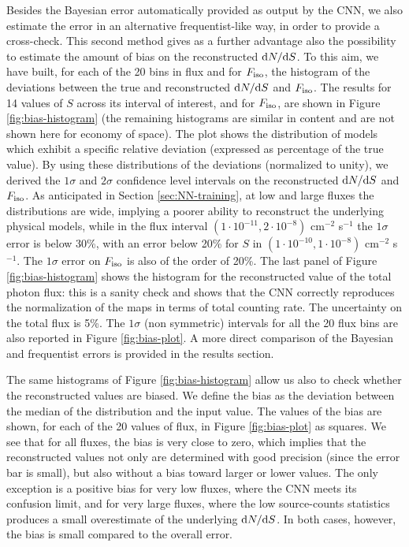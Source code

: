 Besides the Bayesian error automatically provided as output by the CNN, we also estimate the error in an alternative frequentist-like way, in order to provide a cross-check. This second method gives as a further advantage also the possibility to estimate the amount of bias on the reconstructed $\text{d}N/\text{d}S$.
To this aim, we have built, for each of the 20 bins in flux and for $F_{\text{iso}}$, the histogram of the deviations between the true and reconstructed $\text{d}N/\text{d}S$  and $F_{\text{iso}}$. The results for 14 values of $S$ across its interval of interest, and for $F_{\text{iso}}$, are shown in Figure \ref{fig:bias-histogram} (the remaining histograms are similar in content and are not shown here for economy of space). The plot shows the distribution of models which exhibit a specific relative deviation (expressed as percentage of the true value). By using these
distributions of the deviations (normalized to unity), we derived the $1\sigma$ and $2\sigma$ confidence level intervals on the reconstructed $\text{d}N/\text{d}S$ and $F_{\text{iso}}$. As anticipated in Section \ref{sec:NN-training}, at low and large fluxes the distributions are wide, implying a poorer ability to reconstruct the underlying physical models, while in the flux interval $(1 \cdot 10^{-11}, 2 \cdot 10^{-8})$ cm$^{-2}$ s$^{-1}$ the $1\sigma$ error is below 30\%, with an error below 20\% for $S$ in $(1 \cdot 10^{-10}, 1 \cdot 10^{-8})$ cm$^{-2}$ s$^{-1}$. The $1\sigma$ error on $F_{\text{iso}}$ is also of the order of 20\%. The last panel of Figure \ref{fig:bias-histogram} shows the histogram for the reconstructed value of the total photon flux: this is a sanity check and shows that the CNN correctly reproduces the normalization of the maps in terms of total counting rate. The uncertainty on the total flux is 5\%. The $1\sigma$ (non symmetric) intervals for all the 20 flux bins are also reported in Figure \ref{fig:bias-plot}.
A more direct comparison of the Bayesian and frequentist errors is provided in the results section.

The same histograms of Figure \ref{fig:bias-histogram} allow us also to check whether the reconstructed values are biased. We define the bias as the deviation between the median of the distribution and the input value. The values of the bias are shown, for each of the 20 values of flux, in Figure \ref{fig:bias-plot} as squares. We see that for all fluxes, the bias is very close to zero, which implies that the reconstructed values not only are determined with good precision (since the error bar is small), but also without a  bias toward larger or lower values. The only exception is a positive bias for very low fluxes, where the CNN meets its confusion limit, and for very large fluxes, where the low source-counts statistics produces a small overestimate of the underlying $\text{d}N/\text{d}S$.
In both cases, however, the bias is small compared to the overall error.

